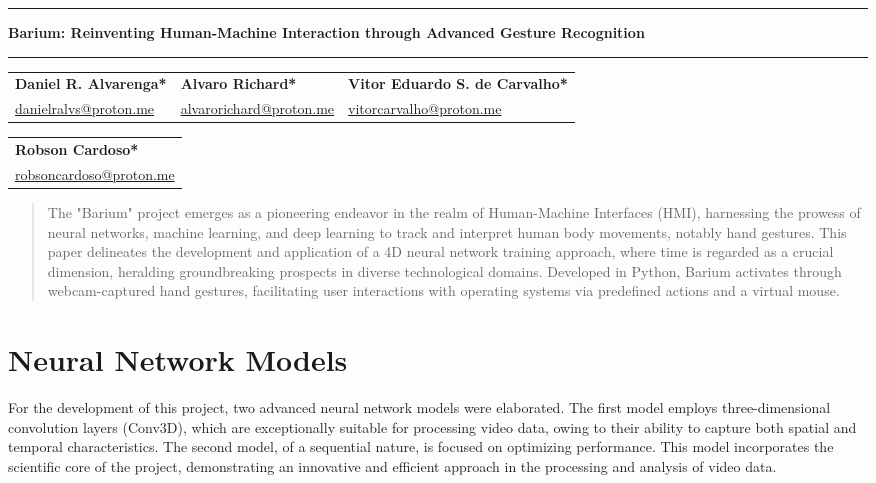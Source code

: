 \documentclass{article}
\begin{document}
\noindent\rule{\textwidth}{1pt} %

\begin{center}
    \Large \textbf{Barium: Reinventing Human-Machine Interaction through Advanced Gesture Recognition} %
\end{center}

\noindent\rule{\textwidth}{3pt} %

\bigskip %

\begin{center}
    \begin{tabular}{p{}p{}p{}}
    \centering \textbf{Daniel R. Alvarenga*} & \centering \textbf{Alvaro Richard*} & \centering \textbf{Vitor Eduardo S. de Carvalho*} \tabularnewline
    \centering \href{mailto:danielralvs@proton.me}{danielralvs@proton.me} & \centering \href{mailto:alvarorichard@proton.me}{alvarorichard@proton.me} & \centering \href{mailto:vitorcarvalho@proton.me}{vitorcarvalho@proton.me} \tabularnewline
    \end{tabular}
\end{center}

\begin{center}
    \begin{tabular}{p{}}
    \centering \textbf{Robson Cardoso*} \tabularnewline
    \centering \href{mailto:robsoncardoso@proton.me}{robsoncardoso@proton.me} \tabularnewline
    \end{tabular}
\end{center}
\bigskip

\begin{abstract}
The "Barium" project emerges as a pioneering endeavor in the realm of Human-Machine Interfaces (HMI), harnessing the prowess of neural networks, machine learning, and deep learning to track and interpret human body movements, notably hand gestures. This paper delineates the development and application of a 4D neural network training approach, where time is regarded as a crucial dimension, heralding groundbreaking prospects in diverse technological domains. Developed in Python, Barium activates through webcam-captured hand gestures, facilitating user interactions with operating systems via predefined actions and a virtual mouse.
\end{abstract}


\section{Neural Network Models}
For the development of this project, two advanced neural network models were elaborated. The first model employs three-dimensional convolution layers (Conv3D), which are exceptionally suitable for processing video data, owing to their ability to capture both spatial and temporal characteristics. The second model, of a sequential nature, is focused on optimizing performance. This model incorporates the scientific core of the project, demonstrating an innovative and efficient approach in the processing and analysis of video data.
\end{document}
